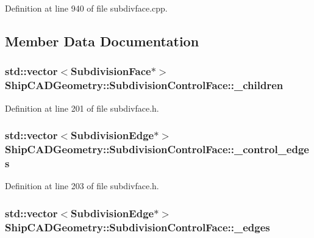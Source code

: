 Definition at line 940 of file subdivface.\-cpp.



\subsection{Member Data Documentation}
\hypertarget{classShipCADGeometry_1_1SubdivisionControlFace_a241bcefc9f6727dec87f6a754f99cc3d}{
\subsubsection[{\-\_\-children}]{\setlength{\rightskip}{0pt plus 5cm}std\-::vector$<${\bf Subdivision\-Face}$\ast$$>$ Ship\-C\-A\-D\-Geometry\-::\-Subdivision\-Control\-Face\-::\-\_\-children\hspace{0.3cm}{\ttfamily [protected]}}}\label{classShipCADGeometry_1_1SubdivisionControlFace_a241bcefc9f6727dec87f6a754f99cc3d}


Definition at line 201 of file subdivface.\-h.

\hypertarget{classShipCADGeometry_1_1SubdivisionControlFace_a48e3cc6374d71f4be7106a48fc321eec}{
\subsubsection[{\-\_\-control\-\_\-edges}]{\setlength{\rightskip}{0pt plus 5cm}std\-::vector$<${\bf Subdivision\-Edge}$\ast$$>$ Ship\-C\-A\-D\-Geometry\-::\-Subdivision\-Control\-Face\-::\-\_\-control\-\_\-edges\hspace{0.3cm}{\ttfamily [protected]}}}\label{classShipCADGeometry_1_1SubdivisionControlFace_a48e3cc6374d71f4be7106a48fc321eec}


Definition at line 203 of file subdivface.\-h.

\hypertarget{classShipCADGeometry_1_1SubdivisionControlFace_a5efceb94118053e2d6ffdff45f68489e}{
\subsubsection[{\-\_\-edges}]{\setlength{\rightskip}{0pt plus 5cm}std\-::vector$<${\bf Subdivision\-Edge}$\ast$$>$ Ship\-C\-A\-D\-Geometry\-::\-Subdivision\-Control\-Face\-::\-\_\-edges\hspace{0.3cm}{\ttfamily [protected]}}}\label{classShipCADGeometry_1_1SubdivisionControlFace_a5efceb94118053e2d6ffdff45f68489e}


